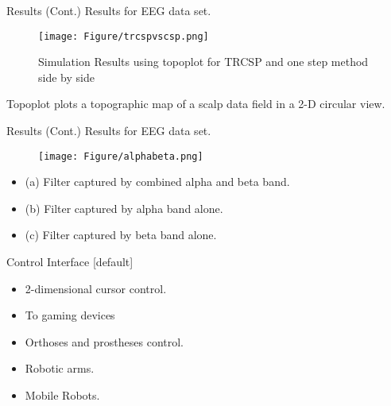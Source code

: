 \documentclass[11pt]{beamer}
\begin{document}
\begin{frame}{Results (Cont.)}
Results for EEG data set.
\begin{figure}
\texttt{[image: Figure/trcspvscsp.png]}
\caption{Simulation Results using topoplot for TRCSP and one step method side by side}
\end{figure}
Topoplot plots a topographic map of a scalp data field in a 2-D circular view.
 \end{frame}
\begin{frame}{Results (Cont.)}
Results for EEG data set.
\begin{figure}
\texttt{[image: Figure/alphabeta.png]}
\end{figure}
\begin{itemize} [ball]
\item (a) Filter captured by combined alpha and beta band.
\item (b) Filter captured by alpha band alone.
\item (c) Filter captured by beta band alone.
  \end{itemize}
 \end{frame}
\begin{frame}{Control Interface}
[default]
  \begin{itemize}
    \item  2-dimensional cursor control.
      \item To gaming devices
        \item Orthoses and prostheses control.
        \item Robotic arms.
    \item Mobile Robots.
          \end{itemize}
  \end{frame}
\end{document}
